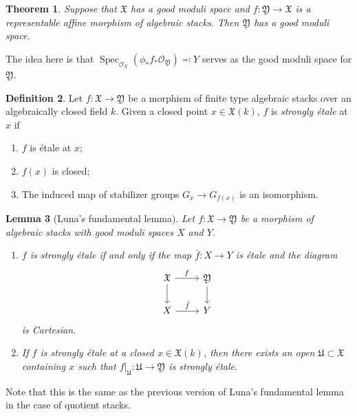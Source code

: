 \documentclass{amsart}
\newtheorem{thm}{Theorem}[section]
\newtheorem{lem}[thm]{Lemma}
\theoremstyle{definition}
\newtheorem{defn}[thm]{Definition}
\theoremstyle{remark}
\theoremstyle{plain}
\theoremstyle{definition}
\theoremstyle{remark}
\newcommand{\mc}[1]{\mathcal{#1}}
\newcommand{\mf}[1]{\mathfrak{#1}}
\newcommand{\1}{\mathbf{1}}
\newcommand{\2}{\mathbf{2}}
\newcommand{\3}{\mathbf{3}}
\DeclareMathOperator{\Spec}{Spec}
\begin{document}
\begin{thm}
    Suppose that \(\mf{X}\) has a good moduli space and \(f \colon \mf{Y} \to \mf{X}\) is a representable affine morphism of algebraic stacks. Then \(\mf{Y}\) has a good moduli space.
\end{thm}

The idea here is that \(\Spec_{\mc{O}_{X}} (\phi_* f_* \mc{O}_{\mf{Y}}) \eqqcolon Y\) serves as the good moduli space for \(\mf{Y}\).

\begin{defn}
    Let \(f \colon \mf{X} \to \mf{Y}\) be a morphism of finite type algebraic stacks over an algebraically closed field \(k\). Given a closed point \(x \in \mf{X}(k)\), \(f\) is \textit{strongly \'etale} at \(x\) if
    \begin{enumerate}
        \item \(f\) is \'etale at \(x\);
        \item \(f(x)\) is closed;
        \item The induced map of stabilizer groups \(G_x \to G_{f(x)}\) is an isomorphism.
    \end{enumerate}
\end{defn}

\begin{lem}[Luna's fundamental lemma]
    Let \(f \colon \mf{X} \to \mf{Y}\) be a morphism of algebraic stacks with good moduli spaces \(X\) and \(Y\).
    \begin{enumerate}
        \item \(f\) is strongly \'etale if and only if the map \(\bar{f} \colon X \to Y\) is \'etale and the diagram
        \begin{equation*}
        \begin{tikzcd}
            \mf{X} \ar{r}{f} \ar{d} & \mf{Y} \ar{d} \\
            X \ar{r}{\bar{f}} & Y
        \end{tikzcd}
        \end{equation*}
        is Cartesian.
        \item If \(f\) is strongly \'etale at a closed \(x \in \mf{X}(k)\), then there exists an open \(\mf{U} \subset \mf{X}\) containing \(x\) such that \(f|_{\mf{U}} \colon \mf{U} \to \mf{Y}\) is strongly \'etale.
    \end{enumerate}
\end{lem}

Note that this is the same as the previous version of Luna's fundamental lemma in the case of quotient stacks.
\end{document}
